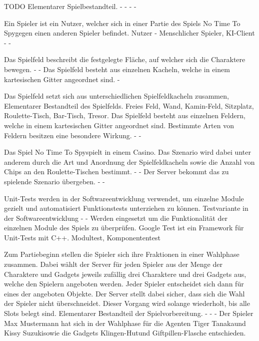 {TODO}
{Elementarer Spielbestandteil.}
{-}
{-}
{-}
{-}

{Ein Spieler ist ein Nutzer, welcher sich in einer Partie des Spiels \glqq No Time To Spy\grqq gegen einen anderen Spieler befindet.}
{Nutzer}
{-}
{Menschlicher Spieler, KI-Client}
{-}
{-}

{Das Spielfeld beschreibt die festgelegte Fläche, auf welcher sich die Charaktere bewegen.}
{-}
{-}
{Das Spielfeld besteht aus einzelnen Kacheln, welche in einem kartesischen Gitter angeordnet sind.}
{-}

{Das Spielfeld setzt sich aus unterschiedlichen Spielfeldkacheln zusammen, }
{Elementarer Bestandteil des Spielfelds.}
{Freies Feld, Wand, Kamin-Feld, Sitzplatz, Roulette-Tisch, Bar-Tisch, Tresor.}
{Das Spielfeld besteht aus einzelnen Feldern, welche in einem kartesischen Gitter angeordnet sind.}
{Bestimmte Arten von Feldern besitzen eine besondere Wirkung.}
{-}
{-}

{Das Spiel \glqq No Time To Spy\grqq spielt in einem Casino. Das Szenario wird dabei unter anderem durch die Art und Anordnung der Spielfeldkacheln sowie die Anzahl von Chips an den Roulette-Tischen bestimmt. }
{-}
{-}
{Der Server bekommt das zu spielende Szenario übergeben.}
{-}
{-}

{Unit-Tests werden in der Softwareentwicklung verwendet, um einzelne Module gezielt und automatisiert Funktionstests unterziehen zu können.}
{Testvariante in der Softwareentwicklung}
{-}
{-}
{Werden eingesetzt um die Funktionalität der einzelnen Module des Spiels zu überprüfen.}
{Google Test ist ein Framework für Unit-Tests mit C++.}
{Modultest, Komponententest}

{Zum Partiebeginn stellen die Spieler sich ihre Fraktionen in einer Wahlphase zusammen. Dabei wählt der Server für jeden Spieler aus der Menge der Charaktere und Gadgets jeweils zufällig drei Charaktere und drei Gadgets aus, welche den Spielern angeboten werden. Jeder Spieler entscheidet sich dann für eines der angeboten Objekte. Der Server stellt dabei sicher, dass sich die Wahl der Spieler nicht überschneidet. Dieser Vorgang wird solange wiederholt, bis alle Slots belegt sind.}
{Elementarer Bestandteil der Spielvorbereitung.}
{-}
{-}
{-}
{Der Spieler \glqq Max Mustermann \grqq hat sich in der Wahlphase für die Agenten \glqq Tiger Tanaka\grqq und \glqq Kissy Suzuki\grqq sowie die Gadgets \glqq Klingen-Hut\grqq und \glqq Giftpillen-Flasche \grqq entschieden.}

